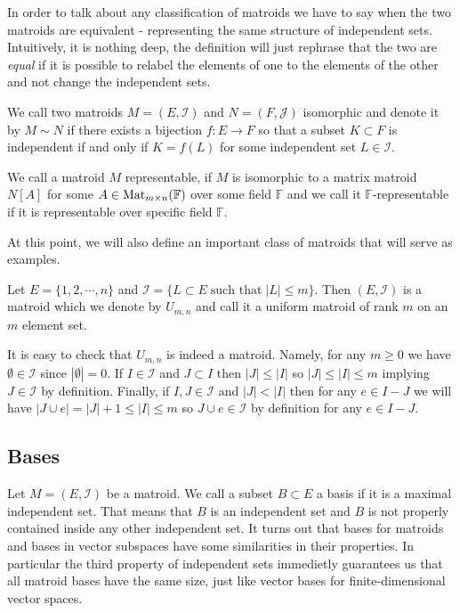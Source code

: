 In order to talk about any classification of matroids we have to say when the two matroids are equivalent - representing the same structure of independent sets. Intuitively, it is nothing deep, the definition will just rephrase that the two are \textit{equal} if it is possible to relabel the elements of one to the elements of the other and not change the independent sets.

\begin{defn}
    We call two matroids $M = (E, \mathcal{I})$ and $N = (F, \mathcal{J})$ isomorphic and denote it by $M \sim N$ if there exists a bijection $f: E \to F$ so that a subset $K \subset F$ is independent if and only if $K = f(L)$ for some independent set $L \in \mathcal{I}$.
\end{defn}


\begin{defn}
    We call a matroid $M$ representable, if $M$ is isomorphic to a matrix matroid $N[A]$ for some $A \in \text{Mat}_{m \times n}(\mathbb{F})$ over some field $\mathbb{F}$ and we call it $\mathbb{F}$-representable if it is representable over specific field $\mathbb{F}$.
\end{defn}

At this point, we will also define an important class of matroids that will serve as examples.

\begin{defn}
    Let $E = \{1, 2, \cdots, n\}$ and $\mathcal{I} = \{ L \subset E \; \text{such that} \; |L| \leq m\}$. Then $(E, \mathcal{I})$ is a matroid which we denote by $U_{m,n}$ and call it a uniform matroid of rank $m$ on an $m$ element set.
\end{defn}

It is easy to check that $U_{m,n}$ is indeed a matroid. Namely, for any $m \geq 0$ we have $\emptyset \in \mathcal{I}$ since $|\emptyset | = 0$. If $I \in \mathcal{I}$ and $J \subset I$ then $|J|\leq |I|$ so $|J|\leq |I| \leq m$ implying $J \in \mathcal{I}$ by definition. Finally, if $I, J \in \mathcal{I}$ and $|J|<|I|$ then for any $e \in I - J$ we will have $|J \cup e| = |J| + 1 \leq |I| \leq m$ so $J \cup e \in \mathcal{I}$ by definition for any $e \in I - J.$

\subsection{Bases}

Let $M = (E, \mathcal{I})$ be a matroid. We call a subset $B \subset E$ a basis if it is a maximal independent set. That means that $B$ is an independent set and $B$ is not properly contained inside any other independent set. It turns out that bases for matroids and bases in vector subspaces have some similarities in their properties. In particular the third property of independent sets immedietly guarantees us that all matroid bases have the same size, just like vector bases for finite-dimensional vector spaces.

